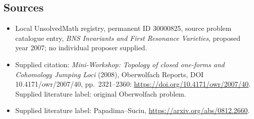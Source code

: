 \documentclass[11pt]{article}
\begin{document}
\subsection{Sources}
\begin{itemize}\item Local UnsolvedMath registry, permanent ID 30000825, source problem catalogue entry, \emph{BNS Invariants and First Resonance Varieties}, proposed year 2007; no individual proposer supplied.\item Supplied citation: \emph{Mini-Workshop: Topology of closed one-forms and Cohomology Jumping Loci} (2008), Oberwolfach Reports, DOI 10.4171/owr/2007/40, pp.\ 2321--2360: \url{https://doi.org/10.4171/owr/2007/40}. Supplied literature label: original Oberwolfach problem.\item Supplied literature label: Papadima--Suciu, \url{https://arxiv.org/abs/0812.2660}.\end{itemize}
\end{document}
